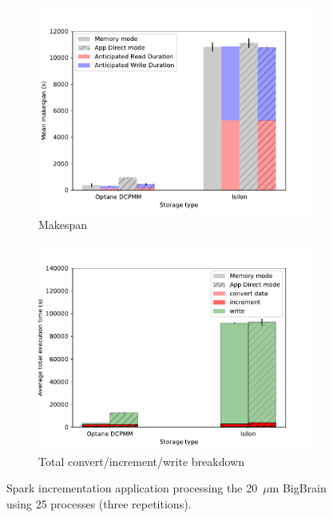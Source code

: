 \begin{figure}
    \begin{subfigure}{0.5\textwidth}
        \centering
    \includegraphics[width=\columnwidth]{figures/optane/makespan-real-spark_20bb_25cpus.pdf}
    \caption{Makespan}\label{fig:optane:20mkspspark25}
\end{subfigure}
\begin{subfigure}{0.5\textwidth}
        \centering
    \includegraphics[width=\columnwidth]{figures/optane/stacked-real-spark_20bb_25cpus.pdf}
    \caption{Total convert/increment/write breakdown}\label{fig:optane:20totalspark:25}
\end{subfigure}
\caption{Spark incrementation application processing the 20~$\mu$m BigBrain
using 25 processes (three repetitions).}\label{fig:optane:20spark25}
\captionsetup{belowskip=-10pt}
\end{figure}

